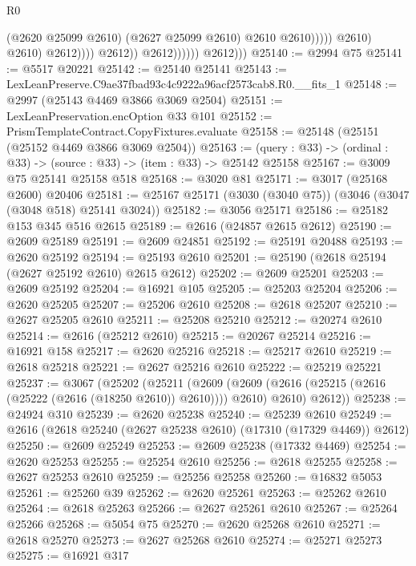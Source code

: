 \begin{lexlean}{R0}
\begin{coremodule}
                                                (@2620 @25099 @2610)
                                                (@2627 @25099 @2610)
                                                @2610
                                                @2610)))))
                                      @2610)
                                    @2610)
                                  @2612))))
                          @2612))
                      @2612))))))
          @2612)))
@25140 := @2994 @75
@25141 := @5517 @20221
@25142 := @25140 @25141
@25143 := LexLeanPreserve.C9ae37fbad93c4c9222a96acf2573cab8.R0.__fits_1
@25148 := @2997 (@25143 @4469 @3866 @3069 @2504)
@25151 := LexLeanPreservation.encOption @33 @101
@25152 := PrismTemplateContract.CopyFixtures.evaluate
@25158 := @25148 (@25151 (@25152 @4469 @3866 @3069 @2504))
@25163 := (query : @33) -> (ordinal : @33) -> (source : @33) -> (item : @33) -> @25142 @25158
@25167 := @3009 @75 @25141 @25158 @518
@25168 := @3020 @81
@25171 := @3017 (@25168 @2600) @20406
@25181 := @25167 @25171 (@3030 (@3040 @75)) (@3046 (@3047 (@3048 @518) @25141 @3024))
@25182 := @3056 @25171
@25186 := @25182 @153 @345 @516 @2615
@25189 := @2616 (@24857 @2615 @2612)
@25190 := @2609 @25189
@25191 := @2609 @24851
@25192 := @25191 @20488
@25193 := @2620 @25192
@25194 := @25193 @2610
@25201 := @25190 (@2618 @25194 (@2627 @25192 @2610) @2615 @2612)
@25202 := @2609 @25201
@25203 := @2609 @25192
@25204 := @16921 @105
@25205 := @25203 @25204
@25206 := @2620 @25205
@25207 := @25206 @2610
@25208 := @2618 @25207
@25210 := @2627 @25205 @2610
@25211 := @25208 @25210
@25212 := @20274 @2610
@25214 := @2616 (@25212 @2610)
@25215 := @20267 @25214
@25216 := @16921 @158
@25217 := @2620 @25216
@25218 := @25217 @2610
@25219 := @2618 @25218
@25221 := @2627 @25216 @2610
@25222 := @25219 @25221
@25237 := @3067
    (@25202
      (@25211
        (@2609 (@2609 (@2616 (@25215 (@2616 (@25222 (@2616 (@18250 @2610)) @2610)))) @2610) @2610)
        @2612))
@25238 := @24924 @310
@25239 := @2620 @25238
@25240 := @25239 @2610
@25249 := @2616 (@2618 @25240 (@2627 @25238 @2610) (@17310 (@17329 @4469)) @2612)
@25250 := @2609 @25249
@25253 := @2609 @25238 (@17332 @4469)
@25254 := @2620 @25253
@25255 := @25254 @2610
@25256 := @2618 @25255
@25258 := @2627 @25253 @2610
@25259 := @25256 @25258
@25260 := @16832 @5053
@25261 := @25260 @39
@25262 := @2620 @25261
@25263 := @25262 @2610
@25264 := @2618 @25263
@25266 := @2627 @25261 @2610
@25267 := @25264 @25266
@25268 := @5054 @75
@25270 := @2620 @25268 @2610
@25271 := @2618 @25270
@25273 := @2627 @25268 @2610
@25274 := @25271 @25273
@25275 := @16921 @317

\end{coremodule}
\end{lexlean}
